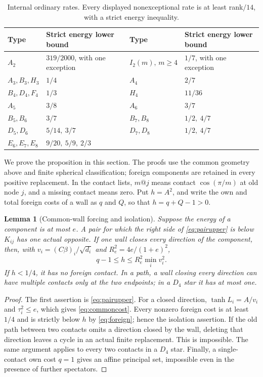 \documentclass[11pt]{article}
\newtheorem{lemma}[theorem]{Lemma}
\theoremstyle{remark}
\begin{document}
\begin{table}[ht]
\centering
\begin{tabular}{ll@{\qquad}ll}
\toprule
Type & Strict energy lower bound & Type & Strict energy lower bound\\
\midrule
$A_2$ & $319/2000$, with one exception &
$I_2(m),\,m\ge4$ & $1/7$, with one exception\\
$A_3,B_3,H_3$ & $1/4$ & $A_4$ & $2/7$\\
$B_4,D_4,F_4$ & $1/3$ & $H_4$ & $11/36$\\
$A_5$ & $3/8$ & $A_6$ & $3/7$\\
$B_5,B_6$ & $3/7$ & $B_7,B_8$ & $1/2,\ 4/7$\\
$D_5,D_6$ & $5/14,\ 3/7$ & $D_7,D_8$ & $1/2,\ 4/7$\\
$E_6,E_7,E_8$ & $9/20,\ 5/9,\ 2/3$ & &\\
\bottomrule
\end{tabular}
\caption{Internal ordinary rates. Every displayed nonexceptional
rate is at least rank$/14$, with a strict energy inequality.}
\label{tab:ordinary}
\end{table}

We prove the proposition in this section. The proofs use the common
geometry above and finite spherical classification; foreign components
are retained in every positive replacement. In the contact lists,
$m@j$ means contact $\cos(\pi/m)$ at old node $j$, and a missing
contact means zero. Put $h=A^2$, and write the own and total foreign
costs of a wall as $q$ and $Q$, so that $h=q+Q-1>0$.

\begin{lemma}[Common-wall forcing and isolation]\label{lem:ordinaryforcing}
Suppose the energy of a component is at most $e$. A pair for which
the right side of \eqref{eq:pairupper} is below $K_{ij}$ has one
actual opposite. If one wall closes every direction of the component,
then, with $v_i=(C\beta)_i/\sqrt{d_i}$ and
$R_e^2=4e/(1+e)^2$,
\begin{equation}\label{eq:commoncost}
 q-1\le h\le R_e^2\min_i v_i^2.
\end{equation}
If $h<1/4$, it has no foreign contact. In a path, a wall closing
every direction can have multiple contacts only at the two endpoints;
in a $D_4$ star it has at most one.
\end{lemma}
\begin{proof}
The first assertion is \eqref{eq:pairupper}. For a closed direction,
$\tanh L_i=A/v_i$ and $\tau_i^2\le e$, which gives
\eqref{eq:commoncost}. Every nonzero foreign cost is at least $1/4$
and is strictly below $h$ by \eqref{eq:foreign}; hence the isolation
assertion. If the old path between two contacts omits a direction
closed by the wall, deleting that direction leaves a cycle in an
actual finite replacement. This is impossible. The same argument
applies to every two contacts in a $D_4$ star. Finally, a single-contact
own cost $q=1$ gives an affine principal set, impossible even in the
presence of further spectators.
\end{proof}
\end{document}
